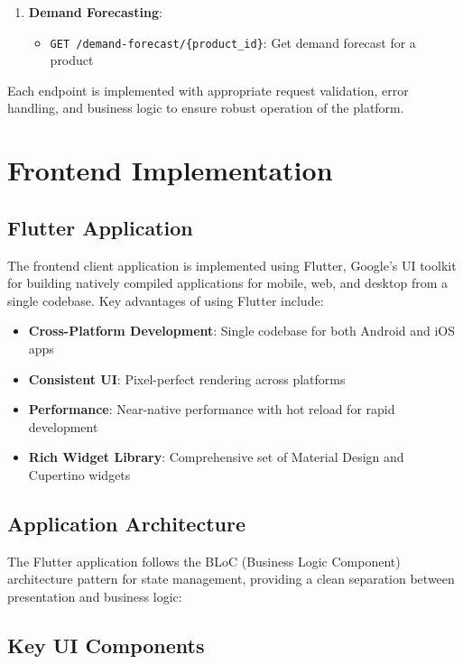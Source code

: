 \begin{enumerate}
    \item \textbf{Demand Forecasting}:
          \begin{itemize}
              \item \texttt{GET /demand-forecast/\{product\_id\}}: Get demand forecast for a product
          \end{itemize}
\end{enumerate}

Each endpoint is implemented with appropriate request validation, error handling, and business logic to ensure robust operation of the platform.

\section{Frontend Implementation}

\subsection{Flutter Application}

The frontend client application is implemented using Flutter, Google's UI toolkit for building natively compiled applications for mobile, web, and desktop from a single codebase. Key advantages of using Flutter include:

\begin{itemize}
    \item \textbf{Cross-Platform Development}: Single codebase for both Android and iOS apps
    \item \textbf{Consistent UI}: Pixel-perfect rendering across platforms
    \item \textbf{Performance}: Near-native performance with hot reload for rapid development
    \item \textbf{Rich Widget Library}: Comprehensive set of Material Design and Cupertino widgets
\end{itemize}

\subsection{Application Architecture}

The Flutter application follows the BLoC (Business Logic Component) architecture pattern for state management, providing a clean separation between presentation and business logic:

\subsection{Key UI Components}

